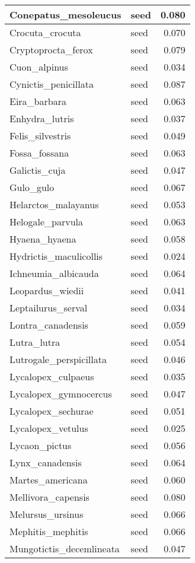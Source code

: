 \begin{table}
\begin{tabular}[t]{l|l|r}
\hline
Conepatus\_mesoleucus & seed & 0.080\\
\hline
Crocuta\_crocuta & seed & 0.070\\
\hline
Cryptoprocta\_ferox & seed & 0.079\\
\hline
Cuon\_alpinus & seed & 0.034\\
\hline
Cynictis\_penicillata & seed & 0.087\\
\hline
Eira\_barbara & seed & 0.063\\
\hline
Enhydra\_lutris & seed & 0.037\\
\hline
Felis\_silvestris & seed & 0.049\\
\hline
Fossa\_fossana & seed & 0.063\\
\hline
Galictis\_cuja & seed & 0.047\\
\hline
Gulo\_gulo & seed & 0.067\\
\hline
Helarctos\_malayanus & seed & 0.053\\
\hline
Helogale\_parvula & seed & 0.063\\
\hline
Hyaena\_hyaena & seed & 0.058\\
\hline
Hydrictis\_maculicollis & seed & 0.024\\
\hline
Ichneumia\_albicauda & seed & 0.064\\
\hline
Leopardus\_wiedii & seed & 0.041\\
\hline
Leptailurus\_serval & seed & 0.034\\
\hline
Lontra\_canadensis & seed & 0.059\\
\hline
Lutra\_lutra & seed & 0.054\\
\hline
Lutrogale\_perspicillata & seed & 0.046\\
\hline
Lycalopex\_culpaeus & seed & 0.035\\
\hline
Lycalopex\_gymnocercus & seed & 0.047\\
\hline
Lycalopex\_sechurae & seed & 0.051\\
\hline
Lycalopex\_vetulus & seed & 0.025\\
\hline
Lycaon\_pictus & seed & 0.056\\
\hline
Lynx\_canadensis & seed & 0.064\\
\hline
Martes\_americana & seed & 0.060\\
\hline
Mellivora\_capensis & seed & 0.080\\
\hline
Melursus\_ursinus & seed & 0.066\\
\hline
Mephitis\_mephitis & seed & 0.066\\
\hline
Mungotictis\_decemlineata & seed & 0.047\\

\end{tabular}
\end{table}

